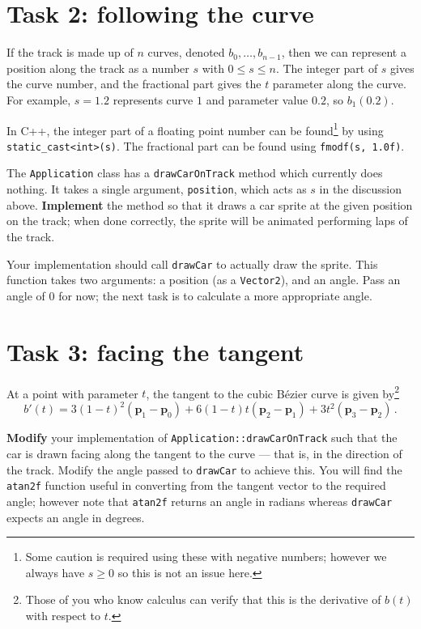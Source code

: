 \documentclass{../../../fal_assignment}
\begin{document}
\section*{Task 2: following the curve}

If the track is made up of $n$ curves, denoted $b_0, \dots, b_{n-1}$, then we can represent a position
along the track as a number $s$ with $0 \leq s \leq n$.
The integer part of $s$ gives the curve number, and the fractional part gives the $t$ parameter along the curve. For example, $s=1.2$ represents curve $1$ and parameter value $0.2$, so $b_1(0.2)$.

In C++, the integer part of a floating point number can be found\footnote{Some caution is required using these with negative numbers; however we always have $s \geq 0$ so this is not an issue here.} by using \lstinline{static_cast<int>(s)}.
The fractional part can be found using \lstinline{fmodf(s, 1.0f)}.

The \lstinline{Application} class has a \lstinline{drawCarOnTrack} method which currently does nothing.
It takes a single argument, \lstinline{position}, which acts as $s$ in the discussion above.
\textbf{Implement} the method so that it draws a car sprite at the given position on the track;
when done correctly, the sprite will be animated performing laps of the track.

Your implementation should call \lstinline{drawCar} to actually draw the sprite.
This function takes two arguments: a position (as a \lstinline{Vector2}), and an angle.
Pass an angle of 0 for now; the next task is to calculate a more appropriate angle.

\section*{Task 3: facing the tangent}

At a point with parameter $t$, the tangent to the cubic B\'ezier curve is given by\footnote{Those of you who know calculus can verify that this is the derivative of $b(t)$ with respect to $t$.}
$$ b'(t) = 3(1-t)^2(\mathbf{p}_1 - \mathbf{p}_0) + 6(1-t)t(\mathbf{p}_2 - \mathbf{p}_1) + 3t^2 (\mathbf{p}_3 - \mathbf{p}_2) \,. $$

\textbf{Modify} your implementation of \lstinline{Application::drawCarOnTrack} such that the car is drawn
facing along the tangent to the curve --- that is, in the direction of the track.
Modify the angle passed to \lstinline{drawCar} to achieve this.
You will find the \lstinline{atan2f} function useful in converting from the tangent vector to the required
angle; however note that \lstinline{atan2f} returns an angle in radians whereas \lstinline{drawCar}
expects an angle in degrees.
\end{document}
